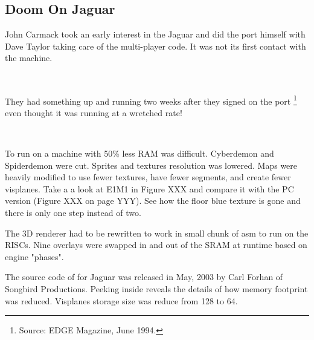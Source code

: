 \subsection{Doom On Jaguar}
John Carmack took an early interest in the Jaguar and did the port himself with Dave Taylor taking care of the multi-player code. It was not its first contact with the machine.\\
\par
{}\\
\par
They had something up and running two weeks after they signed on the port \footnote{Source: EDGE Magazine, June 1994.} even thought it was running at a wretched rate!\\
\par
{}\\
\par
To run on a machine with 50\% less RAM was difficult. Cyberdemon and Spiderdemon were cut. Sprites and textures resolution was lowered. Maps were heavily modified to use fewer textures, have fewer segments, and create fewer visplanes. Take a a look at E1M1 in Figure XXX and compare it with the PC version (Figure XXX on page YYY). See how  the floor blue texture is gone and there is only one step instead of two.\\
\par
The 3D renderer had to be rewritten to work in small chunk of asm to run on the RISCs. Nine overlays were swapped in and out of the SRAM at runtime based on engine "phases".
\par
{}
\par
The source code of \doom for Jaguar was released in May, 2003 by Carl Forhan of Songbird Productions. Peeking inside reveals the details of how memory footprint was reduced. Visplanes storage size was reduce from 128 to 64.\\
